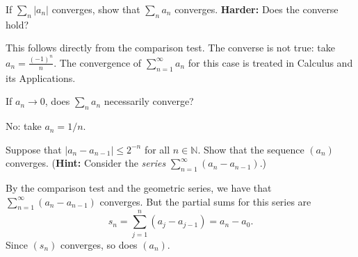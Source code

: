 \documentclass[11pt,dvipsnames]{book}
\numberwithin{equation}{section} %
\numberwithin{figure}{section} %
\numberwithin{table}{section} %
\begin{document}
\begin{exercise}
If $\sum_n |a_n|$ converges, show that $\sum_n a_n$ converges. {\bf Harder:} Does the converse hold?
\begin{solution}
This follows directly from the comparison test. The converse is not true: take $a_n = \frac{(-1)^n}{n}$. The convergence of $\sum_{n=1}^\infty a_n$ for this case is treated in Calculus and its Applications. 
\end{solution}
\end{exercise}

\begin{exercise} If $a_n \to 0$,
does $\sum_n a_n$ necessarily converge? 
\begin{solution}
No: take $a_n = 1/n$.
\end{solution}
\end{exercise}

\begin{exercise}
Suppose that $|a_n - a_{n-1}| \leq 2^{-n}$ for all $n \in \mathbb{N}$. Show that the sequence $(a_n)$ converges. ({\bf Hint:} Consider the {\em series} $\sum_{n=1}^\infty (a_n - a_{n-1})$.)
\begin{solution}
By the comparison test and the geometric series, we have that $\sum_{n=1}^\infty (a_n - a_{n-1})$ converges.
But the partial sums for this series are
\[ s_n = \sum_{j=1}^n (a_j - a_{j-1}) = a_n - a_0.\]
Since $(s_n)$ converges, so does $(a_n)$.
\end{solution}
\end{exercise}
\end{document}
